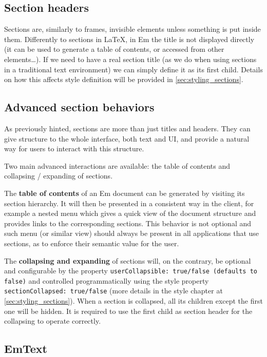 \subsection{Section headers}

Sections are, similarly to frames, invisible elements unless something is put inside them. Differently to sections in \LaTeX, in Em the title is not displayed directly (it can be used to generate a table of contents, or accessed from other elements\ldots). If we need to have a real section title (as we do when using sections in a traditional text environment) we can simply define it as its first child. Details on how this affects style definition will be provided in \ref{sec:styling_sections}.

\subsection{Advanced section behaviors}

As previously hinted, sections are more than just titles and headers. They can give structure to the whole interface, both text and UI, and provide a natural way for users to interact with this structure.

Two main advanced interactions are available: the table of contents and collapsing / expanding of sections.

The \textbf{table of contents} of an Em document can be generated by visiting its section hierarchy. It will then be presented in a consistent way in the client, for example a nested menu which gives a quick view of the document structure and provides links to the corresponding sections. This behavior is not optional and such menu (or similar view) should always be present in all applications that use sections, as to enforce their semantic value for the user.

The \textbf{collapsing and expanding} of sections will, on the contrary, be optional and configurable by the property \texttt{userCollapsible: true/false (defaults to false)} and controlled programmatically using the style property \texttt{sectionCollapsed: true/false} (more details in the style chapter at \ref{sec:styling_sections}). When a section is collapsed, all its children except the first one will be hidden. It is required to use the first child as section header for the collapsing to operate correctly.

\subsection{EmText}

